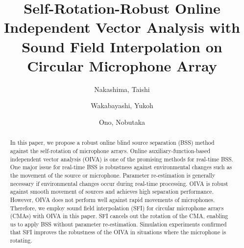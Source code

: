 \documentclass[sip,biber]{now-journal}
\title{Self-Rotation-Robust Online Independent Vector Analysis with\\Sound Field Interpolation on Circular Microphone Array}
\author{Nakashima, Taishi}
\affil{Tokyo Metropolitan University, Tokyo, Japan}
\author{Wakabayashi, Yukoh}
\affil{Toyohashi University of Technology, Aichi, Japan}
\author[1]{Ono, Nobutaka}
\begin{document}
\begin{abstract}
  In this paper, we propose a robust online blind source separation (BSS) method against the self-rotation of microphone arrays.
  Online auxiliary-function-based independent vector analysis (OIVA) is one of the promising methods for real-time BSS.
  One major issue for real-time BSS is robustness against environmental changes such as the movement of the source or microphone.
  Parameter re-estimation is generally necessary if environmental changes occur during real-time processing.
  OIVA is robust against smooth movement of sources and achieves high separation performance.
  However, OIVA does not perform well against rapid movements of microphones.
  Therefore, we employ sound field interpolation (SFI) for circular microphone arrays (CMAs) with OIVA in this paper.
  SFI cancels out the rotation of the CMA, enabling us to apply BSS without parameter re-estimation.
  Simulation experiments confirmed that SFI improves the robustness of the OIVA in situations where the microphone is rotating.
\end{abstract}
\end{document}
